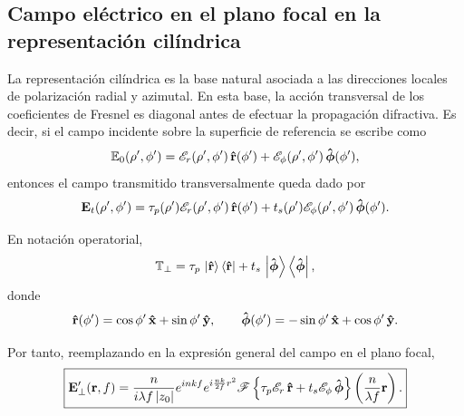
\subsection{Campo eléctrico en el plano focal en la representación cilíndrica}

La representación cilíndrica es la base natural asociada a las direcciones locales de polarización radial y azimutal. En esta base, la acción transversal de los coeficientes de Fresnel es diagonal antes de efectuar la propagación difractiva. Es decir, si el campo incidente sobre la superficie de referencia se escribe como
\begin{equation}
  \mathbb E_0(\rho',\phi')
  =
  \mathscr E_r(\rho',\phi')\,\bm{\hat{\mathbf{r}}}(\phi')
  +
  \mathscr E_\phi(\rho',\phi')\,\bm{\hat{\mathbf{\phi}}}(\phi'),
\end{equation}
entonces el campo transmitido transversalmente queda dado por
\begin{equation}
  \vb E_t(\rho',\phi')
  =
  \tau_p(\rho')\mathscr E_r(\rho',\phi')\,\bm{\hat{\mathbf{r}}}(\phi')
  +
  t_s(\rho')\mathscr E_\phi(\rho',\phi')\,\bm{\hat{\mathbf{\phi}}}(\phi').
  \label{eq:T_cylindrical_basis}
\end{equation}

En notación operatorial,
\begin{equation}
  \mathbb T_\perp
  =
  \tau_p\,\ket{\bm{\hat{\mathbf{r}}}}\bra{\bm{\hat{\mathbf{r}}}}
  +
  t_s\,\ket{\bm{\hat{\mathbf{\phi}}}}\bra{\bm{\hat{\mathbf{\phi}}}},
  \label{eq:M_in_cylindrical_basis}
\end{equation}
donde
\begin{equation}
  \bm{\hat{\mathbf{r}}}(\phi')
  =
  \cos\phi'\,\bm{\hat{\mathbf{x}}}
  +
  \sin\phi'\,\bm{\hat{\mathbf{y}}},
  \qquad
  \bm{\hat{\mathbf{\phi}}}(\phi')
  =
  -\sin\phi'\,\bm{\hat{\mathbf{x}}}
  +
  \cos\phi'\,\bm{\hat{\mathbf{y}}}.
  \label{eq:cylindrical_unit_vectors}
\end{equation}

Por tanto, reemplazando en la expresión general del campo en el plano focal,
\begin{equation}
\boxed{
  \vb E'_\perp(\vb r,f)
  =
  \frac{n}{i\lambda f\,|z_0|}
  e^{inkf}
  e^{i\frac{nk}{2f}r^2}
  \mathscr F
  \left\{
    \tau_p\mathscr E_r\,\bm{\hat{\mathbf{r}}}
    +
    t_s\mathscr E_\phi\,\bm{\hat{\mathbf{\phi}}}
  \right\}
  \left(
    \frac{n}{\lambda f}\vb r
  \right).
}
\label{eq:E_prime_cylindrical_general}
\end{equation}

